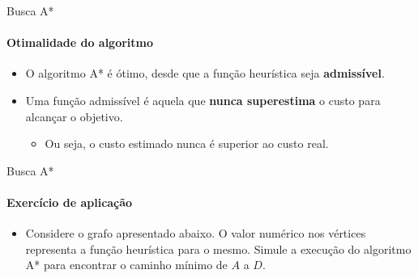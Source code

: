 \begin{frame}{Busca A*}
\framesubtitle{Otimalidade do algoritmo}

\begin{itemize}
	\item O algoritmo A* é ótimo, desde que a função heurística seja \textbf{admissível}.
	\item Uma função admissível é aquela que \textbf{nunca superestima} o custo para alcançar o objetivo.
	\begin{itemize}
		\item Ou seja, o custo estimado nunca é superior ao custo real.
	\end{itemize}
\end{itemize}
\end{frame}



\begin{frame}{Busca A*}
\framesubtitle{Exercício de aplicação}

\begin{itemize}
	\item Considere o grafo apresentado abaixo. O valor numérico nos vértices representa a função heurística para o mesmo. Simule a execução do algoritmo A* para encontrar o caminho mínimo de $A$ a $D$.
\end{itemize}

\begin{figure}[width=0.5\textwidth]
\end{figure}
\end{frame}


